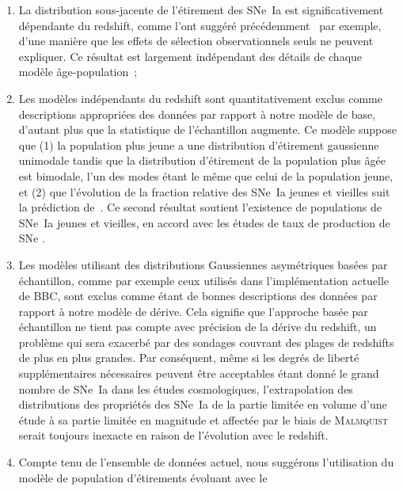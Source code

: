 \documentclass[../main/main.tex]{subfiles}
\begin{document}
\begin{enumerate}
    \item La distribution sous-jacente de l'étirement des SNe~Ia est
        significativement dépendante du redshift, comme l'ont suggéré
        précédemment~\cite{howell2007} par exemple, d'une manière que les effets
        de sélection observationnels seuls ne peuvent expliquer. Ce résultat est
        largement indépendant des détails de chaque modèle âge-population~;
    \item Les modèles indépendants du redshift sont quantitativement exclus
        comme descriptions appropriées des données par rapport à notre modèle de
        base, d'autant plus que la statistique de l'échantillon augmente. Ce
        modèle suppose que (1) la population plus jeune a une distribution
        d'étirement gaussienne unimodale tandis que la distribution d'étirement
        de la population plus âgée est bimodale, l'un des modes étant le même
        que celui de la population jeune, et (2) que l'évolution de la fraction
        relative des SNe~Ia jeunes et vieilles suit la prédiction
        de~\cite{rigault2020}. Ce second résultat soutient l'existence de
        populations de SNe~Ia jeunes et vieilles, en accord avec les études de
        taux de production de SNe \citep{mannucci2005, scannapieco2005,
        sullivan2006, aubourg2008}.
    \item Les modèles utilisant des distributions Gaussiennes asymétriques
        basées par échantillon, comme par exemple ceux utilisés dans
        l'implémentation actuelle de BBC, sont exclus comme étant de bonnes
        descriptions des données par rapport à notre modèle de dérive. Cela
        signifie que l'approche basée par échantillon ne tient pas compte avec
        précision de la dérive du redshift, un problème qui sera exacerbé par
        des sondages couvrant des plages de redshifts de plus en plus grandes.
        Par conséquent, même si les degrés de liberté supplémentaires
        nécessaires peuvent être acceptables étant donné le grand nombre de
        SNe~Ia dans les études cosmologiques, l'extrapolation des distributions
        des propriétés des SNe~Ia de la partie limitée en volume d'une
        étude à sa partie limitée en magnitude et affectée par le biais de
        \textsc{Malmquist} serait toujours inexacte en raison de l'évolution
        avec le redshift.
    \item Compte tenu de l'ensemble de données actuel, nous suggérons
        l'utilisation du modèle de population d'étirements évoluant avec le

\end{enumerate}
\end{document}
